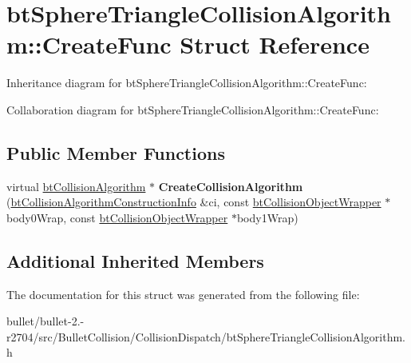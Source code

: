\hypertarget{structbt_sphere_triangle_collision_algorithm_1_1_create_func}{\section{bt\+Sphere\+Triangle\+Collision\+Algorithm\+:\+:Create\+Func Struct Reference}
\label{structbt_sphere_triangle_collision_algorithm_1_1_create_func}
}


Inheritance diagram for bt\+Sphere\+Triangle\+Collision\+Algorithm\+:\+:Create\+Func\+:


Collaboration diagram for bt\+Sphere\+Triangle\+Collision\+Algorithm\+:\+:Create\+Func\+:
\subsection*{Public Member Functions}
\begin{DoxyCompactItemize}
\item 
\hypertarget{structbt_sphere_triangle_collision_algorithm_1_1_create_func_a2e923d86c88767f081b3a6ac7ad22d14}{virtual \hyperlink{classbt_collision_algorithm}{bt\+Collision\+Algorithm} $\ast$ {\bfseries Create\+Collision\+Algorithm} (\hyperlink{structbt_collision_algorithm_construction_info}{bt\+Collision\+Algorithm\+Construction\+Info} \&ci, const \hyperlink{structbt_collision_object_wrapper}{bt\+Collision\+Object\+Wrapper} $\ast$body0\+Wrap, const \hyperlink{structbt_collision_object_wrapper}{bt\+Collision\+Object\+Wrapper} $\ast$body1\+Wrap)}\label{structbt_sphere_triangle_collision_algorithm_1_1_create_func_a2e923d86c88767f081b3a6ac7ad22d14}

\end{DoxyCompactItemize}
\subsection*{Additional Inherited Members}


The documentation for this struct was generated from the following file\+:\begin{DoxyCompactItemize}
\item 
bullet/bullet-\/2.-\/r2704/src/\+Bullet\+Collision/\+Collision\+Dispatch/bt\+Sphere\+Triangle\+Collision\+Algorithm.\+h\end{DoxyCompactItemize}
